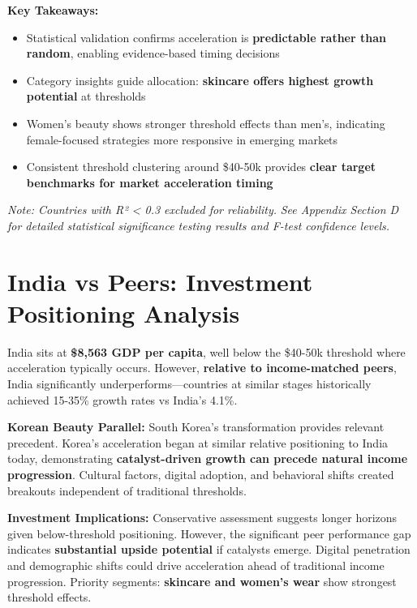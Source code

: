 \documentclass[11pt]{article}
\begin{document}
\textbf{Key Takeaways:}
\vspace{-3pt}
\begin{itemize}
    \setlength{\itemsep}{1pt}
    \item Statistical validation confirms acceleration is \textbf{predictable rather than random}, enabling evidence-based timing decisions
    \item Category insights guide allocation: \textbf{skincare offers highest growth potential} at thresholds
    \item Women's beauty shows stronger threshold effects than men's, indicating female-focused strategies more responsive in emerging markets
    \item Consistent threshold clustering around \$40-50k provides \textbf{clear target benchmarks for market acceleration timing}
\end{itemize}
\textit{Note: Countries with R² < 0.3 excluded for reliability.} \textit{See Appendix Section D for detailed statistical significance testing results and F-test confidence levels.}

\section{India vs Peers: Investment Positioning Analysis}

India sits at \textbf{\$8,563 GDP per capita}, well below the \$40-50k threshold where acceleration typically occurs. However, \textbf{relative to income-matched peers}, India significantly underperforms—countries at similar stages historically achieved 15-35\% growth rates vs India's 4.1\%.

\textbf{Korean Beauty Parallel:} South Korea's transformation provides relevant precedent. Korea's acceleration began at similar relative positioning to India today, demonstrating \textbf{catalyst-driven growth can precede natural income progression}. Cultural factors, digital adoption, and behavioral shifts created breakouts independent of traditional thresholds.

\textbf{Investment Implications:} Conservative assessment suggests longer horizons given below-threshold positioning. However, the significant peer performance gap indicates \textbf{substantial upside potential} if catalysts emerge. Digital penetration and demographic shifts could drive acceleration ahead of traditional income progression. Priority segments: \textbf{skincare and women's wear} show strongest threshold effects. 
\end{document}
